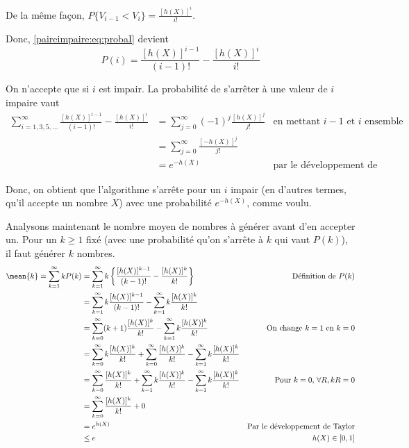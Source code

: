 De la même façon, $P\{V_{i-1} < V_i\} = \frac{[h(X)]^i}{i!}$.

Donc, \eqref{paireimpaire:eq:probaI} devient
\begin{equation}
    P(i) = \frac{[h(X)]^{i-1}}{(i-1)!} - \frac{[h(X)]^i}{i!}
\end{equation}

On n'accepte que si $i$ est impair. La probabilité de s'arrêter à une valeur de $i$ impaire vaut
\begin{align*}
    \sum_{i=1,3,5,\dots}^\infty \frac{[h(X)]^{i-1}}{(i-1)!} - \frac{[h(X)]^i}{i!} & = \sum_{j=0}^\infty (-1)^j \frac{[h(X)]^j}{j!} & \text{en mettant $i-1$ et $i$ ensemble} \\
    & = \sum_{j=0}^\infty \frac{[-h(X)]^j}{j!}\\
    & = e^{-h(X)} & \text{par le développement de Taylor}
\end{align*}

Donc, on obtient que l'algorithme s'arrête pour un $i$ impair (en d'autres termes, qu'il accepte un nombre $X$) avec une probabilité $e^{-h(X)}$, comme voulu.

Analysons maintenant le nombre moyen de nombres à générer avant d'en accepter un. Pour un $k \geq 1$ fixé (avec une probabilité qu'on s'arrête à $k$ qui vaut $P(k)$), il faut générer $k$ nombres.
\begin{align*}
    \mean{k} = \sum_{k=1}^\infty kP(k) & = \sum_{k=1}^\infty k \left\{ \frac{[h(X)]^{k-1}}{(k-1)!} - \frac{[h(X)]^k}{k!} \right\} & \text{Définition de $P(k)$} \\
    & = \sum_{k=1}^\infty k\frac{[h(X)]^{k-1}}{(k-1)!} - \sum_{k=1}^\infty k \frac{[h(X)]^k}{k!} \\
    & = \sum_{k=0}^\infty (k+1)\frac{[h(X)]^k}{k!} - \sum_{k=1}^\infty k \frac{[h(X)]^k}{k!} & \text{On change $k=1$ en $k=0$} \\
    & = \sum_{k=0}^\infty k \frac{[h(X)]^k}{k!} + \sum_{k=0}^\infty \frac{[h(X)]^k}{k!} - \sum_{k=1}^\infty k \frac{[h(X)]^k}{k!} \\
    & = \sum_{k=0}^\infty \frac{[h(X)]^k}{k!} + \sum_{k=1}^\infty k\frac{[h(X)]^k}{k!} - \sum_{k=1}^\infty k\frac{[h(X)]^k}{k!} & \text{Pour $k=0$, $\forall R, kR = 0$}\\
    & = \sum_{k=0}^\infty \frac{[h(X)]^k}{k!} + 0 \\
    & = e^{h(X)} & \text{Par le développement de Taylor} \\
    & \leq e & \text{$h(X) \in [0, 1]$}
\end{align*}

